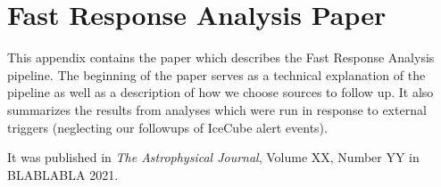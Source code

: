\chapter{Fast Response Analysis Paper}
\label{app:FRA_external_paper}

This appendix contains the paper which describes the Fast Response Analysis pipeline. The beginning of the paper serves as a technical explanation of the pipeline as well as a description of how we choose sources to follow up. It also summarizes the results from analyses which were run in response to external triggers (neglecting our followups of IceCube alert events). 

It was published in \textit{The Astrophysical Journal}, Volume XX, Number YY in BLABLABLA 2021.



